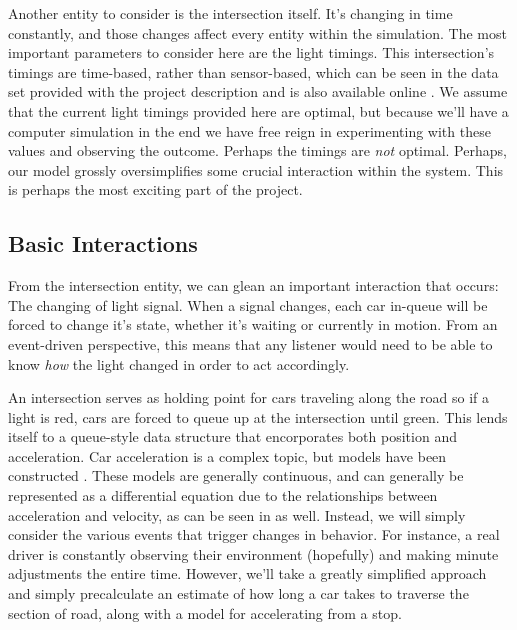 \documentclass[a4paper,12pt]{article}
\begin{document}
Another entity to consider is the intersection itself. It's changing in time constantly, and those changes affect
every entity within the simulation. The most important parameters to consider here are the light timings. This
intersection's timings are time-based, rather than sensor-based, which can be seen in the data set provided with the
project description and is also available online \cite{ngsim}. We assume that the current light timings provided here
are optimal, but because we'll have a computer simulation in the end we have free reign in experimenting with these
values and observing the outcome. Perhaps the timings are \emph{not} optimal. Perhaps, our model grossly oversimplifies
some crucial interaction within the system. This is perhaps the most exciting part of the project.

\subsection{Basic Interactions}
From the intersection entity, we can glean an important interaction that occurs: The changing of light signal. When a
signal changes, each car in-queue will be forced to change it's state, whether it's waiting or currently in motion.
From an event-driven perspective, this means that any listener would need to be able to know \emph{how} the light
changed in order to act accordingly.

An intersection serves as holding point for cars traveling along the road so if a light is red, cars are forced to
queue up at the intersection until green. This lends itself to a queue-style data structure that encorporates both
position and acceleration. Car acceleration is a complex topic, but models have been constructed \cite{bonneson}
\cite{herman_et_al}. These models are generally continuous, and can generally be represented as a differential equation
due to the relationships between acceleration and velocity, as can be seen in \cite{briggs} \cite{deceleration} as well.
Instead, we will simply consider the various events that trigger changes in behavior. For instance, a real driver is
constantly observing their environment (hopefully) and making minute adjustments the entire time. However, we'll take
a greatly simplified approach and simply precalculate an estimate of how long a car takes to traverse the section of
road, along with a model for accelerating from a stop.
\end{document}

